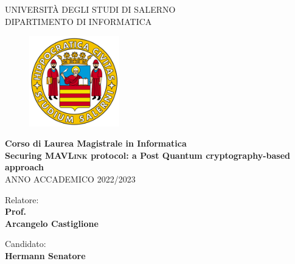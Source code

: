 \documentclass[a4paper, 12pt, oneside]{article}
\begin{document}
\begin{titlepage}
    \begin{center}
        \LARGE{\uppercase{Università degli Studi di Salerno}}\\
        \vspace{5mm}
    	\uppercase{\normalsize Dipartimento di Informatica }\\
    \end{center}
    \begin{figure}[H]
        \centering
        \includegraphics[width=0.35\textwidth]{logo_unisa}
    \end{figure}
    
    \begin{center}
        \normalsize{\textbf{Corso di Laurea Magistrale in Informatica}}\\
    	\vspace{10mm}
    	\LARGE{\textbf{Securing \textsc{MAVLink} protocol: a Post Quantum cryptography-based approach}}\\
    	\vspace{3mm}
        \large{\uppercase{Anno Accademico 2022/2023}}
    \end{center}

    \vspace{60mm}
    \noindent
    \begin{minipage}[t]{0.4\textwidth}
    	Relatore:\\\textbf{Prof.\\Arcangelo Castiglione}
    	\vspace{12mm}\\
    \end{minipage}
    \hfill
    \begin{minipage}[t]{0.4\textwidth}\raggedleft
    	Candidato: \\\textbf{Hermann Senatore}
    \end{minipage}
\end{titlepage}

\tableofcontents
\newpage
\end{document}

